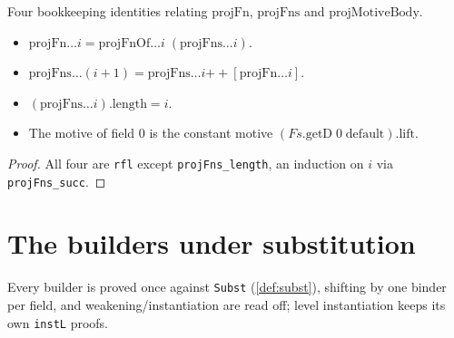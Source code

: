 \begin{lemma}
  \label{fam:proj-unfolding}
  \leanok

   Four bookkeeping identities relating $\mathrm{projFn}$, $\mathrm{projFns}$ and
  $\mathrm{projMotiveBody}$.
  \begin{itemize}
  \item $\mathrm{projFn}\dots i = \mathrm{projFnOf}\dots i\;(\mathrm{projFns}\dots i)$.
  \item $\mathrm{projFns}\dots(i+1) = \mathrm{projFns}\dots i \mathbin{+\!\!+}
        [\mathrm{projFn}\dots i]$.
  \item $(\mathrm{projFns}\dots i).\mathrm{length} = i$.
  \item The motive of field $0$ is the constant motive $(Fs.\mathrm{getD}\;0\;
        \mathrm{default}).\mathrm{lift}$.
  \end{itemize}
\end{lemma}
\begin{proof}
  \leanok
   All four are \texttt{rfl} except \texttt{projFns\_length}, an induction on $i$ via
  \texttt{projFns\_succ}.
\end{proof}

\section{The builders under substitution}

Every builder is proved once against \texttt{Subst} (\ref{def:subst}), shifting by one binder per
field, and weakening/instantiation are read off; level instantiation keeps its own \texttt{instL}
proofs.

